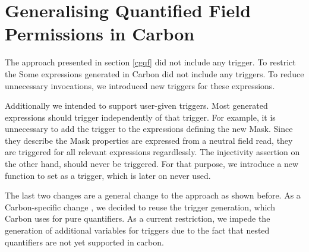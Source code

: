 \documentclass[12pt]{article}
\begin{document}
\section{Generalising Quantified Field Permissions in Carbon}
\label{genField}
The approach presented in section \ref{cgqf} did not include any trigger. To restrict the 
Some expressions generated in Carbon did not include any triggers. To reduce unnecessary invocations, we introduced new triggers for these expressions.

Additionally we intended to support user-given triggers. Most generated expressions should trigger independently of that trigger. For example, it is unnecessary to add the trigger to the expressions defining the new Mask. Since they describe the Mask properties are expressed from a neutral field read, they are triggered for all relevant expressions regardlessly. The injectivity assertion on the other hand, should never be triggered. For that purpose, we introduce a new function to set as a trigger, which is later on never used.

The last two changes are a general change to the approach as shown before. As a Carbon-specific change , we decided to reuse the trigger generation, which Carbon uses for pure quantifiers. As a current restriction, we impede the generation of additional variables for triggers due to the fact that nested quantifiers are not yet supported in carbon.
\end{document}
